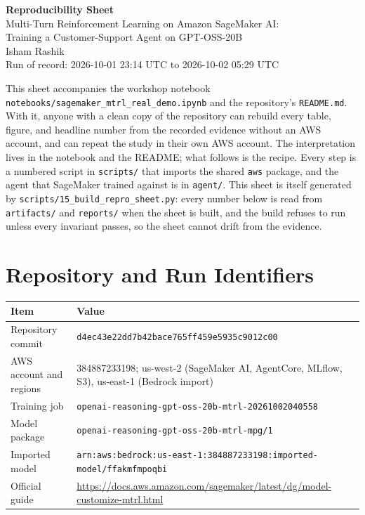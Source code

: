 \documentclass[11pt]{article}
\begin{document}
\begin{center}
{\LARGE\bfseries Reproducibility Sheet}\\[6pt]
{\large Multi-Turn Reinforcement Learning on Amazon SageMaker AI:\\
Training a Customer-Support Agent on GPT-OSS-20B}\\[12pt]
{\large Isham Rashik}\\[4pt]
Run of record: 2026-10-01 23:14 UTC to 2026-10-02 05:29 UTC
\end{center}

This sheet accompanies the workshop notebook \texttt{notebooks/sagemaker\_mtrl\_real\_demo.ipynb} and the
repository's \texttt{README.md}. With it, anyone with a clean copy of the repository can rebuild every table,
figure, and headline number from the recorded evidence without an AWS account, and can repeat the study in
their own AWS account. The interpretation lives in the notebook and the README; what follows is the recipe.
Every step is a numbered script in \texttt{scripts/} that imports the shared \texttt{aws} package, and the
agent that SageMaker trained against is in \texttt{agent/}. This sheet is itself generated by
\texttt{scripts/15\_build\_repro\_sheet.py}: every number below is read from \texttt{artifacts/} and
\texttt{reports/} when the sheet is built, and the build refuses to run unless every invariant passes, so the
sheet cannot drift from the evidence.

\section{Repository and Run Identifiers}
\begin{center}
\begin{minipage}{\linewidth}\centering
\begin{tabular}{P{3.6cm}P{11.8cm}}
\toprule
\textbf{Item} & \textbf{Value} \\
\midrule
Repository commit & \texttt{d4ec43e22dd7b42bace765ff459e5935c9012c00} \\
AWS account and regions & 384887233198; us-west-2 (SageMaker AI, AgentCore, MLflow, S3), us-east-1 (Bedrock import) \\
Training job & \texttt{openai-reasoning-gpt-oss-20b-mtrl-20261002040558} \\
Model package & \texttt{openai-reasoning-gpt-oss-20b-mtrl-mpg/1} \\
Imported model & \nolinkurl{arn:aws:bedrock:us-east-1:384887233198:imported-model/ffakmfmpoqbi} \\
Official guide & \url{https://docs.aws.amazon.com/sagemaker/latest/dg/model-customize-mtrl.html} \\
\bottomrule
\end{tabular}
\end{minipage}
\end{center}
\end{document}
